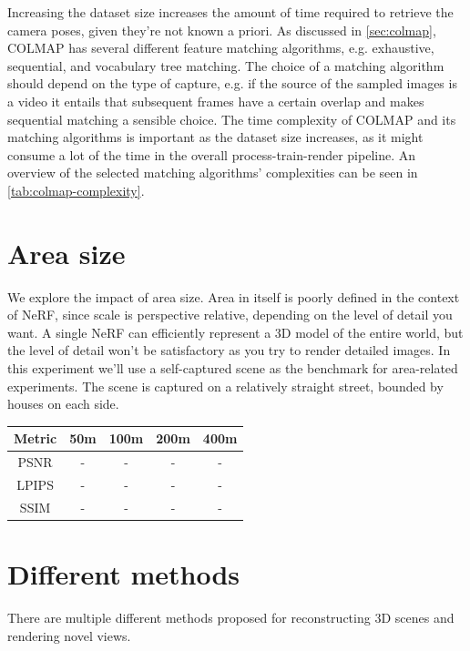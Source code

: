 Increasing the dataset size increases the amount of time required to retrieve the camera poses, given they're not known a priori. As discussed in \autoref{sec:colmap}, COLMAP has several different feature matching algorithms, e.g. exhaustive, sequential, and vocabulary tree matching. The choice of a matching algorithm should depend on the type of capture, e.g. if the source of the sampled images is a video it entails that subsequent frames have a certain overlap and makes sequential matching a sensible choice. The time complexity of COLMAP and its matching algorithms is important as the dataset size increases, as it might consume a lot of the time in the overall process-train-render pipeline. An overview of the selected matching algorithms' complexities can be seen in \autoref{tab:colmap-complexity}.

\section{Area size}

We explore the impact of area size. Area in itself is poorly defined in the context of NeRF, since scale is perspective relative, depending on the level of detail you want. A single NeRF can efficiently represent a 3D model of the entire world, but the level of detail won't be satisfactory as you try to render detailed images. In this experiment we'll use a self-captured scene as the benchmark for area-related experiments. The scene \cite{data:streetview} is captured on a relatively straight street, bounded by houses on each side. 

\begin{table}[h]
\begin{tabular}{ccccc}
\hline
Metric & 50m & 100m & 200m & 400m \\ \hline
PSNR   & -   & -    & -    & -    \\
LPIPS  & -   & -    & -    & -    \\
SSIM   & -   & -    & -    & -    \\ \hline
\end{tabular}
\end{table}

\section{Different methods}

There are multiple different methods proposed for reconstructing 3D scenes and rendering novel views.

